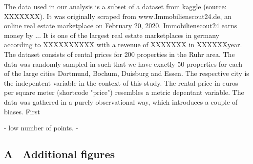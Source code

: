 \documentclass[12 pt]{scrartcl}
\begin{document}
The data used in our analysis is a subset of a dataset from kaggle (source: XXXXXXX). It was originally scraped from www.Immobilienscout24.de, an online real estate marketplace on February 20, 2020. Immobilienscout24 earns money by ...
It is one of the largest real estate marketplaces in germany according to XXXXXXXXXX with a revenue of XXXXXXX in XXXXXXyear. 
The dataset consists of rental prices for 200 properties in the Ruhr area. The data was randomly sampled in such that we have exactly 50 properties for each of the large cities Dortmund, Bochum, Duisburg and Essen. The respective city is the indepentent variable in the context of this study. The rental price in euros per square meter (shortcode "price") resembles a metric depentant variable. The data was gathered in a purely observational way, which introduces a couple of biases. First 

- low number of points.
- 


\newpage
{}
\renewcommand\refname{Bibliography}



\newpage
\appendix
{}
\subsection*{A \ Additional figures}
\end{document}
